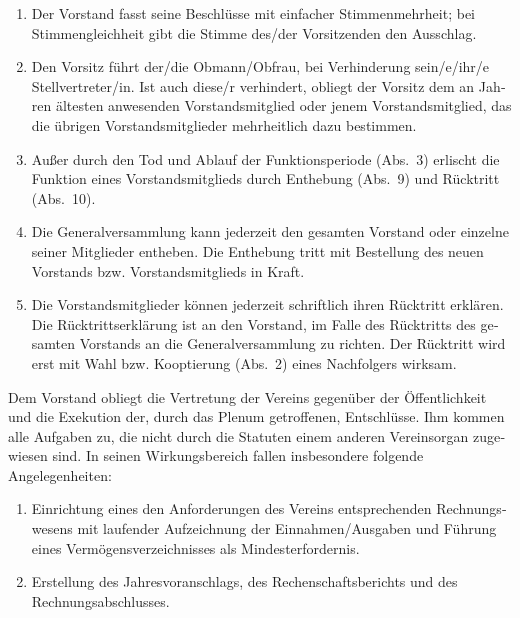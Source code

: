 \begin{otherlanguage}{german}
\begin{enumerate}[statutenenum]
    \item Der Vorstand fasst seine Beschlüsse mit einfacher Stimmenmehrheit;
        bei Stimmengleichheit gibt die Stimme des/der Vorsitzenden den Ausschlag.

    \item Den Vorsitz führt der/die Obmann/Obfrau, bei Verhinderung sein/e/ihr/e Stellvertreter/in.
        Ist auch diese/r verhindert, obliegt der Vorsitz dem an Jahren ältesten anwesenden Vorstandsmitglied oder jenem Vorstandsmitglied, das die übrigen Vorstandsmitglieder mehrheitlich dazu bestimmen.

    \item Außer durch den Tod und Ablauf der Funktionsperiode (Abs.\ 3) erlischt die Funktion eines Vorstandsmitglieds durch Enthebung (Abs.\ 9) und Rücktritt (Abs.\ 10).

    \item Die Generalversammlung kann jederzeit den gesamten Vorstand oder einzelne seiner Mitglieder entheben.
        Die Enthebung tritt mit Bestellung des neuen Vorstands bzw. Vorstandsmitglieds in Kraft.

    \item Die Vorstandsmitglieder können jederzeit schriftlich ihren Rücktritt erklären.
        Die Rücktrittserklärung ist an den Vorstand, im Falle des Rücktritts des gesamten Vorstands an die Generalversammlung zu richten.
        Der Rücktritt wird erst mit Wahl bzw. Kooptierung (Abs.\ 2) eines Nachfolgers wirksam.
\end{enumerate}


Dem Vorstand obliegt die Vertretung der Vereins gegenüber der Öffentlichkeit und die Exekution der, durch das Plenum getroffenen, Entschlüsse.
Ihm kommen alle Aufgaben zu, die nicht durch die Statuten einem anderen Vereinsorgan zugewiesen sind.
In seinen Wirkungsbereich fallen insbesondere folgende Angelegenheiten:

\begin{enumerate}[statutenenum]
    \item Einrichtung eines den Anforderungen des Vereins entsprechenden Rechnungswesens mit laufender Aufzeichnung der Einnahmen/Ausgaben und Führung eines Vermögensverzeichnisses als Mindesterfordernis.

    \item Erstellung des Jahresvoranschlags, des Rechenschaftsberichts und des Rechnungsabschlusses.


\end{enumerate}
\end{otherlanguage}
